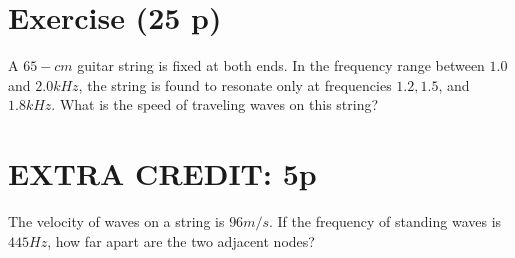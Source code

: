 \documentclass[12pt]{article}
\begin{document}
\section*{Exercise \theexample (25 p)}

A $65-cm$ guitar string is fixed at both ends. In the
frequency range between $1.0$ and $2.0 kHz$, the string is found
to resonate only at frequencies $1.2,1.5$, and $1.8 kHz$. What is
the speed of traveling waves on this string?


\section*{EXTRA CREDIT: 5p}

The velocity of waves on a string is $96 m/s$. If the
frequency of standing waves is $445 Hz$, how far apart are the
two adjacent nodes?
\end{document}
